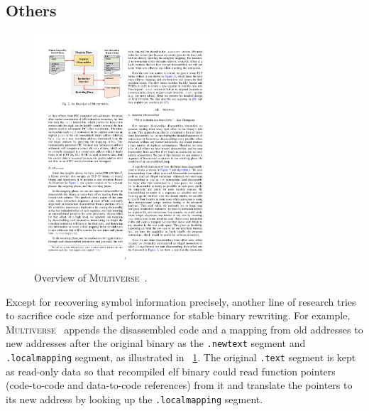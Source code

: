 \subsection{Others} \label{sec:existing-dis-others}

\begin{figure}[tb]
  \centering
  \includegraphics[width=0.6\textwidth]{fig/superset.pdf}
  \caption{Overview of \textsc{Multiverse}~\cite{bauman2018superset}.}
  \label{fig:superset}
\end{figure}

Except for recovering symbol information precisely, another line of research tries to sacrifice code size and performance for stable binary rewriting. For example, \textsc{Multiverse}~\cite{bauman2018superset,miller2019probabilistic} appends the disassembled code and a mapping from old addresses to new addresses after the original binary as the \texttt{.newtext} segment and \texttt{.localmapping} segment, as illustrated in \F~\ref{fig:superset}. The original \texttt{.text} segment is kept as read-only data so that recompiled elf binary could read function pointers (code-to-code and data-to-code references) from it and translate the pointers to its new address by looking up the \texttt{.localmapping} segment.

